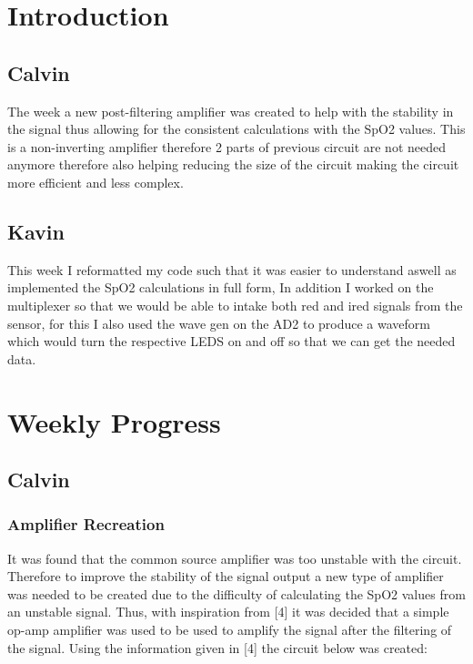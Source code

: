 \documentclass{article}
\begin{document}
\maketitle
\newpage
\section{Introduction}
\subsection{Calvin}
The week a new post-filtering amplifier was created to help with the stability in the signal thus allowing for the consistent calculations with the SpO2 values. This is a non-inverting amplifier therefore 2 parts of previous circuit are not needed anymore therefore also helping reducing the size of the circuit making the circuit more efficient and less complex.
\subsection{Kavin}
This week I reformatted my code such that it was easier to understand aswell as implemented the SpO2 calculations in full form, In addition I worked on the multiplexer so that we would be able to intake both red and ired signals from the sensor, for this I also used the wave gen on the AD2 to produce a waveform which would turn the respective LEDS on and off so that we can get the needed data.
\newpage
\section{Weekly Progress}
\subsection{Calvin}
\subsubsection{Amplifier Recreation}
It was found that the common source amplifier was too unstable with the circuit. Therefore to improve the stability of the signal output a new type of amplifier was needed to be created due to the difficulty of calculating the SpO2 values from an unstable signal. Thus, with inspiration from [4] it was decided that a simple op-amp amplifier was used to be used to amplify the signal after the filtering of the signal. Using the information given in [4] the circuit below was created:
\end{document}
